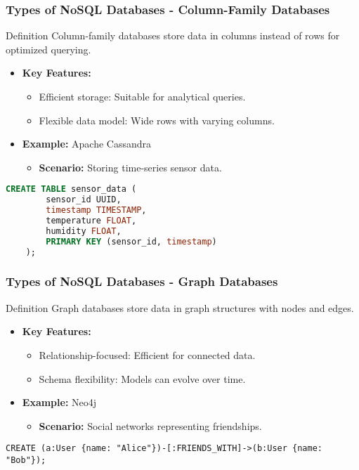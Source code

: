 \documentclass[aspectratio=169]{beamer}
\begin{document}
\begin{frame}[fragile]
    \frametitle{Types of NoSQL Databases - Column-Family Databases}
    \begin{block}{Definition}
        Column-family databases store data in columns instead of rows for optimized querying.
    \end{block}

    \begin{itemize}
        \item \textbf{Key Features:}
        \begin{itemize}
            \item Efficient storage: Suitable for analytical queries.
            \item Flexible data model: Wide rows with varying columns.
        \end{itemize}
        
        \item \textbf{Example:} Apache Cassandra
        \begin{itemize}
            \item \textbf{Scenario:} Storing time-series sensor data.
        \end{itemize}
    \end{itemize}

    \begin{lstlisting}[language=sql]
    CREATE TABLE sensor_data (
        sensor_id UUID,
        timestamp TIMESTAMP,
        temperature FLOAT,
        humidity FLOAT,
        PRIMARY KEY (sensor_id, timestamp)
    );
    \end{lstlisting}
\end{frame}

\begin{frame}[fragile]
    \frametitle{Types of NoSQL Databases - Graph Databases}
    \begin{block}{Definition}
        Graph databases store data in graph structures with nodes and edges.
    \end{block}

    \begin{itemize}
        \item \textbf{Key Features:}
        \begin{itemize}
            \item Relationship-focused: Efficient for connected data.
            \item Schema flexibility: Models can evolve over time.
        \end{itemize}
        
        \item \textbf{Example:} Neo4j
        \begin{itemize}
            \item \textbf{Scenario:} Social networks representing friendships.
        \end{itemize}
    \end{itemize}

    \begin{lstlisting}[language=cypher]
    CREATE (a:User {name: "Alice"})-[:FRIENDS_WITH]->(b:User {name: "Bob"});
    \end{lstlisting}
\end{frame}
\end{document}
